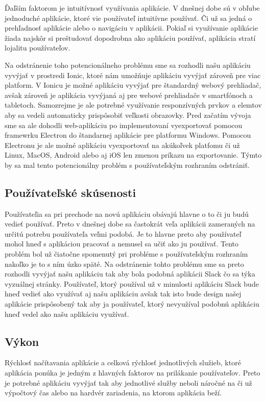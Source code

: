 \indent Ďaľším faktorom je intuitívnosť využívania aplikácie. V dnešnej dobe sú v obľube jednoduché aplikácie, ktoré vie používateľ intuitívne používať. Či už sa jedná o prehľadnosť aplikácie alebo o navigáciu v aplikácii. Pokiaľ si využívanie aplikácie žiada najskôr si preštudovať dopodrobna ako aplikáciu používať, aplikácia stratí lojalitu používateľov. 

\indent Na odstránenie toho potencionálneho problému sme sa rozhodli našu aplikáciu vyvýjať v prostredi Ionic, ktoré nám umožňuje aplikáciu vyvýjať zároveň pre viac platform. V Ionicu je možné aplikáciu vyvýjať pre štandardný webový prehliadač, avšak zároveň je aplikácia vyvýjaná aj pre webové prehliadače v smartfónoch a tabletoch. Samozrejme je ale potrebné využívanie responzívných prvkov a elemtov aby sa vedeli automaticky prispôsobiť veľkosti obrazovky. Pred začatím vývoja sme sa ale dohodli web-aplikáciu po implementovaní vyexportovať pomocou framewrku Electron do štandarnej aplikácie pre platformu Windows. Pomocou Electronu je ale možné aplikáciu vyexportovať na akúkoľvek platfomu či už Linux, MacOS, Android alebo aj iOS len zmenou príkazu na exportovanie. Týmto by sa mal tento potencionálny problém s používateľským rozhraním odstrániť.

\subsection{Používateľské skúsenosti}
\indent Používateľia sa pri prechode na novú aplikáciu obávajú hlavne o to či ju budú vedieť používať. Preto v dnešnej dobe sa častokrát veľa aplikácii zameraných na určitú potrebu používateľa veľmi podobá. Je to hlavne preto aby používateľ mohol hneď s aplikáciou pracovať a nemusel sa učiť ako ju používať. Tento problém bol už čiatočne spomenutý pri probléme s používateľským rozhraním nakoľko je to s ním úzko späté. Na odstránenie tohto problému sme sa preto rozhodli vyvýjať našu aplikáciu tak aby bola podobná aplikácii Slack čo sa týka vyzuálnej stránky. Používateľ, ktorý používal už v minulosti aplikáciu Slack bude hneď vedieť ako využívať aj našu aplikáciu avšak tak isto bude design našej aplikácie prispôsobený tak aby ja používateľ, ktorý nevyužíval podobnú aplikáciu hneď vedel ako našu aplikáciu využívať.

\subsection{Výkon}
\indent Rýchlosť načítavania aplikácie a celková rýchlosť jednotlivých služieb, ktoré aplikácia ponúka je jedným z hlavných faktorov na prilákanie používateľov. Preto je potrebné aplikáciu vyvýjať tak aby jednotlivé služby neboli náročné na či už výpočtový čas alebo na hardvér zariadenia, na ktorom aplikácia beží. 


